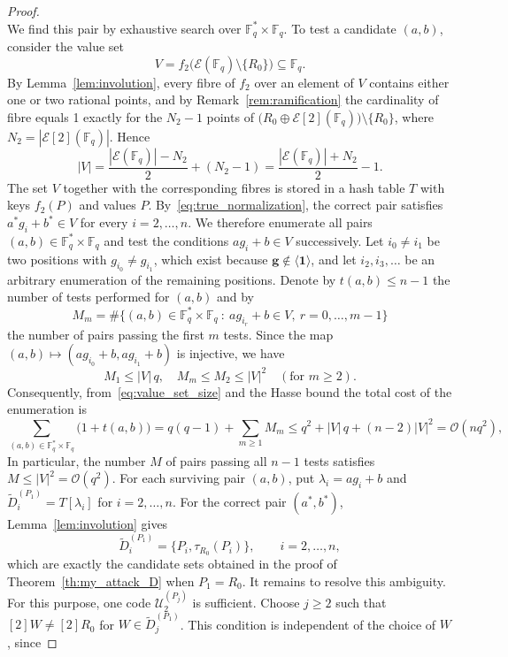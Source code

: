 \documentclass[sn-mathphys-num]{sn-jnl_modified}
\newcommand{\FF}{\ensuremath{\mathbb{F}}}
\begin{document}
\begin{proof}
\begin{equation}
\end{equation}
We find this pair by exhaustive search over $\FF_q^* \times \FF_q$. To test a candidate $(a,b)$, consider the value set
\[
V = f_2\bigl(\mathcal{E}(\FF_q) \setminus \{R_0\}\bigr) \subseteq \FF_q .
\]
By Lemma~\ref{lem:involution}, every fibre of $f_2$ over an element of $V$ contains either one or two rational points, and by Remark~\ref{rem:ramification} the cardinality of fibre equals 1 exactly for the $N_2-1$ points of $\bigl(R_0 \oplus \mathcal{E}[2](\FF_q)\bigr) \setminus \{R_0\}$, where $N_2 = |\mathcal{E}[2](\FF_q)|$. Hence
\begin{equation}\label{eq:value_set_size}
|V| = \frac{|\mathcal{E}(\FF_q)| - N_2}{2} + (N_2 - 1)
= \frac{|\mathcal{E}(\FF_q)| + N_2}{2} - 1.
\end{equation}
The set $V$ together with the corresponding fibres is stored in a hash table $T$ with keys $f_2(P)$ and values $P$. By~\eqref{eq:true_normalization}, the correct pair satisfies $a^*g_i+b^* \in V$ for every $i=2,\dots,n$. We therefore enumerate all pairs $(a,b) \in \FF_q^* \times \FF_q$ and test the conditions $a g_i+b\in V$ successively. Let $i_0\neq i_1$ be two positions with $g_{i_0}\neq g_{i_1}$, which exist because $\mathbf{g}\notin\langle\mathbf{1}\rangle$, and let $i_2,i_3,\dots$ be an arbitrary enumeration of the remaining positions. Denote by $t(a,b)\leq n-1$ the number of tests performed for $(a,b)$ and by
\[
M_m = \#\bigl\{(a,b) \in \FF_q^* \times \FF_q \ :\ a g_{i_r} + b \in V, \ r = 0,\dots,m-1\bigr\}
\]
the number of pairs passing the first $m$ tests. Since the map $(a,b)\mapsto(a g_{i_0}+b,a g_{i_1}+b)$ is injective, we have
\begin{equation}\label{eq:survivors_bound}
M_1 \leq |V|\,q, \quad M_m \leq M_2 \leq |V|^2 \quad (\text{for } m\geq2).
\end{equation}
Consequently, from~\eqref{eq:value_set_size} and the Hasse bound the total cost of the enumeration is
\[
\sum_{(a,b) \in \FF_q^* \times \FF_q} \bigl(1+t(a,b)\bigr) = q(q-1)+\sum_{m\geq1}M_m \leq q^2+|V|\,q+(n-2)|V|^2 = \mathcal{O}(nq^2),
\]
In particular, the number $M$ of pairs passing all $n-1$ tests satisfies $M\leq|V|^2=\mathcal{O}(q^2)$. For each surviving pair $(a,b)$, put $\lambda_i = a g_i+b$ and $\widetilde{D}_i^{(P_1)}=T[\lambda_i]$ for $i=2,\dots,n$. For the correct pair $(a^*,b^*)$, Lemma~\ref{lem:involution} gives
\[
\widetilde{D}_i^{(P_1)} = \{P_i,\tau_{R_0}(P_i)\}, \qquad i=2,\dots,n,
\]
which are exactly the candidate sets obtained in the proof of Theorem~\ref{th:my_attack_D} when $P_1=R_0$. It remains to resolve this ambiguity. For this purpose, one code $\mathcal{U}_2^{(P_j)}$ is sufficient. Choose $j\geq2$ such that $[2]W\neq[2]R_0$ for $W\in\widetilde{D}_j^{(P_1)}$. This condition is independent of the choice of $W$, since

\end{proof}
\end{document}
